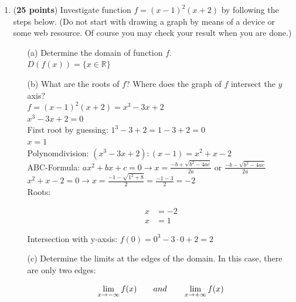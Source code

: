 \documentclass[a4paper]{article}
\begin{document}
\begin{enumerate}
	
\item (\textbf{25 points}) Investigate function $f = (x-1)^2(x+2)$ by following the steps below. (Do not start with drawing a graph by means of a device or some web resource. Of course you may check your result when you are done.) 
	
	\begin{enumerate}
			\item[(a)] Determine the domain of function $f$.\\
			
$D(f(x)) = \{ x \in \mathbb{R}\}$\\				
			
			
			
			\item[(b)] What are the roots of $f$? Where does the graph of $f$ intersect the $y$ axis?\\
			
$f = (x-1)^2(x+2) = x^3 - 3x + 2$\\
$x^3 - 3x + 2 = 0$\\			

First root by guessing: $1^3 - 3 + 2 = 1 - 3 + 2 = 0$\\
$x = 1$\\

Polynomdivision: $(x^3 - 3x +2): (x - 1) = x^2 + x - 2$\\

ABC-Formula: $ax^2 + bx + c = 0 \rightarrow x = \frac{-b + \sqrt{b^2 - 4ac}}{2a} $ or $\frac{-b - \sqrt{b^2 - 4ac}}{2a}$\\

$x^2 + x - 2 = 0 \rightarrow x = \frac{-1 - \sqrt{1^2 + 8}}{2} = \frac{-1 - 3}{2} = -2$\\

Roots:

\begin{align*}
	x &= -2\\
	x&= 1
\end{align*}			
		
Intersection with y-axsis: $f(0)	= 0^3 - 3 \cdot 0 + 2 = 2$\\	
		
			
			
			\item[(c)] Determine the limits at the edges of the domain. In this case, there are only two edges:
			
			\begin{equation}
			\lim_{x \to -\infty}f(x) \qquad and \qquad \lim_{x \to + \infty}f(x) \notag
			\end{equation}
			

\end{enumerate}
\end{enumerate}
\end{document}
